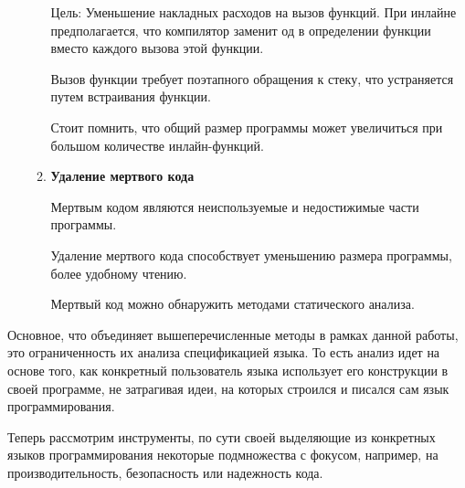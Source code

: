 \documentclass{mipt-thesis-bs}
\begin{document}
\begin{enumerate}
\begin{enumerate}
        Цель: Уменьшение накладных расходов на вызов функций.
        При инлайне предполагается, что компилятор заменит од в определении функции вместо
        каждого вызова этой функции.

        Вызов функции требует поэтапного обращения к стеку, что устраняется путем
        встраивания функции.

        Стоит помнить, что общий размер программы может увеличиться при большом
        количестве инлайн-функций.

        \item \textbf{Удаление мертвого кода}

        Мертвым кодом являются неиспользуемые и недостижимые части программы.

        Удаление мертвого кода способствует уменьшению размера программы, более
        удобному чтению.

        Мертвый код можно обнаружить методами статического анализа.
    \end{enumerate}
\end{enumerate}

Основное, что объединяет вышеперечисленные методы в рамках данной работы, это ограниченность их
анализа спецификацией языка. То есть анализ идет на основе того, как конкретный пользователь
языка использует его конструкции в своей программе, не затрагивая идеи, на которых строился
и писался сам язык программирования.

Теперь рассмотрим инструменты, по сути своей выделяющие из конкретных языков программирования
некоторые подмножества с фокусом, например, на производительность, безопасность или надежность кода.
\end{document}
